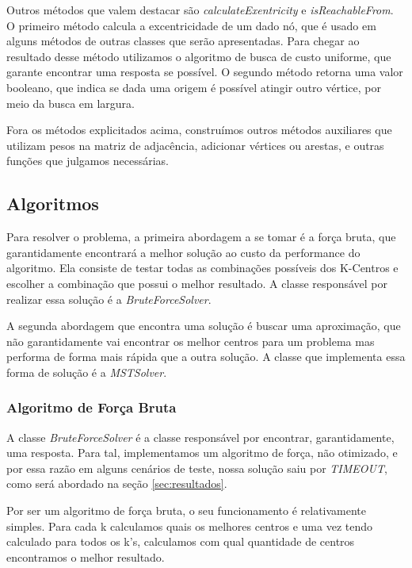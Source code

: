 Outros métodos que valem destacar são \textit{calculateExentricity} e \textit{isReachableFrom}. O primeiro método calcula a excentricidade de um dado nó, que é usado em alguns métodos de outras classes que serão apresentadas. Para chegar ao resultado desse método utilizamos o algoritmo de busca de custo uniforme, que garante encontrar uma resposta se possível. O segundo método retorna uma valor booleano, que indica se dada uma origem é possível atingir outro vértice, por meio da busca em largura.

Fora os métodos explicitados acima, construímos outros métodos auxiliares que utilizam pesos na matriz de adjacência, adicionar vértices ou arestas, e outras funções que julgamos necessárias.

\subsection{\esp Algoritmos} \label{algoritmos}

Para resolver o problema, a primeira abordagem a se tomar é a força bruta, que garantidamente encontrará a melhor solução ao custo da performance do algoritmo. Ela consiste de testar todas as combinações possíveis dos K-Centros e escolher a combinação que possui o melhor resultado. A classe responsável por realizar essa solução é a \textit{BruteForceSolver}.

A segunda abordagem que encontra uma solução é buscar uma aproximação, que não garantidamente vai encontrar os melhor centros para um problema mas performa de forma mais rápida que a outra solução. A classe que implementa essa forma de solução é a \textit{MSTSolver}.

\subsubsection{\esp Algoritmo de Força Bruta}

A classe \textit{BruteForceSolver} é a classe responsável por encontrar, garantidamente, uma resposta. Para tal, implementamos um algoritmo de força, não otimizado, e por essa razão em alguns cenários de teste, nossa solução saiu por \textit{TIMEOUT}, como será abordado na seção \ref{sec:resultados}.

Por ser um algoritmo de força bruta, o seu funcionamento é relativamente simples. Para cada k calculamos quais os melhores centros e uma vez tendo calculado para todos os k’s, calculamos com qual quantidade de centros encontramos o melhor resultado.

